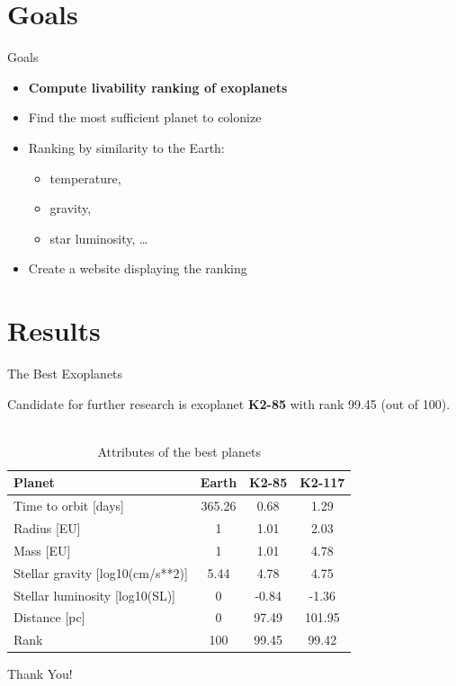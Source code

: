 \documentclass[aspectratio=169]{beamer}
\begin{document}
\section{Goals}

\begin{frame}{Goals}
    \begin{itemize}
        \item \textbf{Compute livability ranking of exoplanets}
        \item Find the most sufficient planet to colonize
        \item Ranking by similarity to the Earth:
            \begin{itemize}
                \item temperature,
                \item gravity,
                \item star luminosity, \dots
            \end{itemize}
        \item Create a website displaying the ranking
    \end{itemize}
\end{frame}

\section{Results}

\begin{frame}{The Best Exoplanets}
    \begin{table}
        Candidate for further research is exoplanet \textbf{K2-85} with rank 99.45 (out of 100). \\~\\
        \begin{tabular}{| l || c | c | c|}
            Planet            & Earth   & K2-85 & K2-117  \\ \hline
            Time to orbit [days] & 365.26 & 0.68   & 1.29 \\ 
            Radius          [EU] & 1         & 1.01   & 2.03 \\
            Mass             [EU] & 1          & 1.01  & 4.78 \\
            Stellar gravity [log10(cm/s**2)] & 5.44     & 4.78   & 4.75 \\
            Stellar luminosity [log10(SL)]& 0     & -0.84 & -1.36 \\
            Distance       [pc] & 0          & 97.49  & 101.95 \\
            Rank              & 100      & 99.45   & 99.42 \\
        \end{tabular}
        \caption{Attributes of the best planets}
    \end{table}
\end{frame}


\begin{frame}
    \begin{center}
        \Huge Thank You!
    \end{center}
\end{frame}
\end{document}
